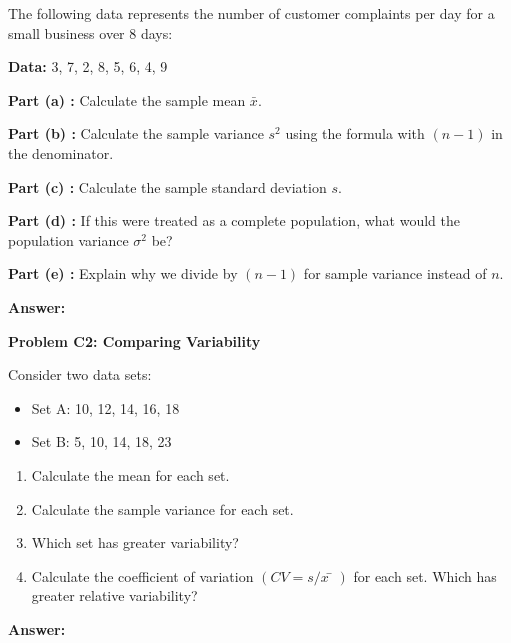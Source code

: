 \documentclass[
  11pt,
]{article}
\providecommand{\tightlist}{%
  \setlength{\itemsep}{0pt}\setlength{\parskip}{0pt}}\usepackage{longtable,booktabs,array}
\begin{document}
The following data represents the number of customer complaints per day
for a small business over 8 days:

\textbf{Data:} 3, 7, 2, 8, 5, 6, 4, 9

\textbf{Part (a) :} Calculate the sample mean \(\bar{x}\).

\textbf{Part (b) :} Calculate the sample variance \(s^2\) using the
formula with \((n-1)\) in the denominator.

\textbf{Part (c) :} Calculate the sample standard deviation \(s\).

\textbf{Part (d) :} If this were treated as a complete population, what
would the population variance \(\sigma^2\) be?

\textbf{Part (e) :} Explain why we divide by \((n-1)\) for sample
variance instead of \(n\).

\textbf{Answer:}

\textbf{Problem C2: Comparing Variability}

Consider two data sets:

\begin{itemize}
\item
  Set A: 10, 12, 14, 16, 18
\item
  Set B: 5, 10, 14, 18, 23
\end{itemize}

\begin{enumerate}
\def\labelenumi{(\alph{enumi})}
\tightlist
\item
  Calculate the mean for each set.
\item
  Calculate the sample variance for each set.
\item
  Which set has greater variability?
\item
  Calculate the coefficient of variation \((CV = s/x̄)\) for each set.
  Which has greater relative variability?
\end{enumerate}

\textbf{Answer:}
\end{document}
